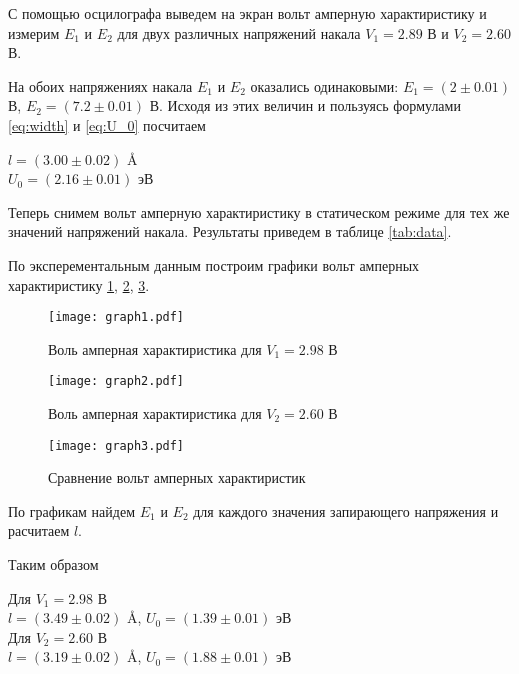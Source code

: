     С помощью осцилографа выведем на экран вольт амперную характиристику и измерим $E_1$ и $E_2$
    для двух различных напряжений накала $V_1 = 2.89$ В и $V_2 = 2.60$ В.

    На обоих напряжениях накала $E_1$ и $E_2$ оказались одинаковыми: $E_1 = (2 \pm 0.01)$ В, $E_2 = (7.2 \pm 0.01)$ В.
    Исходя из этих величин и пользуясь формулами \eqref{eq:width} и \eqref{eq:U_0} посчитаем 

    \begin{center}
        $l = (3.00 \pm 0.02)$ \AA \\
        $U_0 = (2.16 \pm 0.01)$ эВ \\
    \end{center}

    Теперь снимем вольт амперную характиристику в статическом режиме для тех же значений напряжений накала.
    Результаты приведем в таблице \ref{tab:data}.

    

    По эксперементальным данным построим графики вольт амперных характиристику \ref{fig:V1}, \ref{fig:V2}, \ref{fig:V1vsV2}.

    \begin{figure}
        \centering
        \texttt{[image: graph1.pdf]}
        \caption{Воль амперная характиристика для $V_1 = 2.98$ В}
        \label{fig:V1}
    \end{figure}

    \begin{figure}
        \centering
        \texttt{[image: graph2.pdf]}
        \caption{Воль амперная характиристика для $V_2 = 2.60$ В}
        \label{fig:V2}
    \end{figure}

    \begin{figure}
        \centering
        \texttt{[image: graph3.pdf]}
        \caption{Сравнение вольт амперных характиристик}
        \label{fig:V1vsV2}
    \end{figure}

    По графикам найдем $E_1$ и $E_2$ для каждого значения запирающего напряжения и расчитаем $l$.

    

    Таким образом

    \begin{center}
        Для $V_1 = 2.98$ В \\ $l = (3.49 \pm 0.02)$ \AA, $U_0 = (1.39 \pm 0.01)$ эВ \\[0.5 cm]
        Для $V_2 = 2.60$ В \\ $l = (3.19 \pm 0.02)$ \AA, $U_0 = (1.88 \pm 0.01)$ эВ \\[0.5 cm]
    \end{center}

